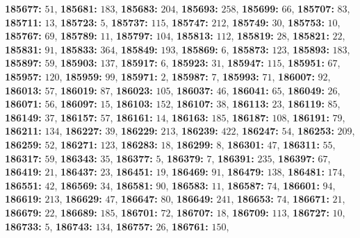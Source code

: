 \textsf{\bfseries 185677:} $51$, \textsf{\bfseries 185681:} $183$, \textsf{\bfseries 185683:} $204$, \textsf{\bfseries 185693:} $258$, \textsf{\bfseries 185699:} $66$, \textsf{\bfseries 185707:} $83$, \textsf{\bfseries 185711:} $13$, \textsf{\bfseries 185723:} $5$, \textsf{\bfseries 185737:} $115$, \textsf{\bfseries 185747:} $212$, \textsf{\bfseries 185749:} $30$, \textsf{\bfseries 185753:} $10$, \textsf{\bfseries 185767:} $69$, \textsf{\bfseries 185789:} $11$, \textsf{\bfseries 185797:} $104$, \textsf{\bfseries 185813:} $112$, \textsf{\bfseries 185819:} $28$, \textsf{\bfseries 185821:} $22$, \textsf{\bfseries 185831:} $91$, \textsf{\bfseries 185833:} $364$, \textsf{\bfseries 185849:} $193$, \textsf{\bfseries 185869:} $6$, \textsf{\bfseries 185873:} $123$, \textsf{\bfseries 185893:} $183$, \textsf{\bfseries 185897:} $59$, \textsf{\bfseries 185903:} $137$, \textsf{\bfseries 185917:} $6$, \textsf{\bfseries 185923:} $31$, \textsf{\bfseries 185947:} $115$, \textsf{\bfseries 185951:} $67$, \textsf{\bfseries 185957:} $120$, \textsf{\bfseries 185959:} $99$, \textsf{\bfseries 185971:} $2$, \textsf{\bfseries 185987:} $7$, \textsf{\bfseries 185993:} $71$, \textsf{\bfseries 186007:} $92$, \textsf{\bfseries 186013:} $57$, \textsf{\bfseries 186019:} $87$, \textsf{\bfseries 186023:} $105$, \textsf{\bfseries 186037:} $46$, \textsf{\bfseries 186041:} $65$, \textsf{\bfseries 186049:} $26$, \textsf{\bfseries 186071:} $56$, \textsf{\bfseries 186097:} $15$, \textsf{\bfseries 186103:} $152$, \textsf{\bfseries 186107:} $38$, \textsf{\bfseries 186113:} $23$, \textsf{\bfseries 186119:} $85$, \textsf{\bfseries 186149:} $37$, \textsf{\bfseries 186157:} $57$, \textsf{\bfseries 186161:} $14$, \textsf{\bfseries 186163:} $185$, \textsf{\bfseries 186187:} $108$, \textsf{\bfseries 186191:} $79$, \textsf{\bfseries 186211:} $134$, \textsf{\bfseries 186227:} $39$, \textsf{\bfseries 186229:} $213$, \textsf{\bfseries 186239:} $422$, \textsf{\bfseries 186247:} $54$, \textsf{\bfseries 186253:} $209$, \textsf{\bfseries 186259:} $52$, \textsf{\bfseries 186271:} $123$, \textsf{\bfseries 186283:} $18$, \textsf{\bfseries 186299:} $8$, \textsf{\bfseries 186301:} $47$, \textsf{\bfseries 186311:} $55$, \textsf{\bfseries 186317:} $59$, \textsf{\bfseries 186343:} $35$, \textsf{\bfseries 186377:} $5$, \textsf{\bfseries 186379:} $7$, \textsf{\bfseries 186391:} $235$, \textsf{\bfseries 186397:} $67$, \textsf{\bfseries 186419:} $21$, \textsf{\bfseries 186437:} $23$, \textsf{\bfseries 186451:} $19$, \textsf{\bfseries 186469:} $91$, \textsf{\bfseries 186479:} $138$, \textsf{\bfseries 186481:} $174$, \textsf{\bfseries 186551:} $42$, \textsf{\bfseries 186569:} $34$, \textsf{\bfseries 186581:} $90$, \textsf{\bfseries 186583:} $11$, \textsf{\bfseries 186587:} $74$, \textsf{\bfseries 186601:} $94$, \textsf{\bfseries 186619:} $213$, \textsf{\bfseries 186629:} $47$, \textsf{\bfseries 186647:} $80$, \textsf{\bfseries 186649:} $241$, \textsf{\bfseries 186653:} $74$, \textsf{\bfseries 186671:} $21$, \textsf{\bfseries 186679:} $22$, \textsf{\bfseries 186689:} $185$, \textsf{\bfseries 186701:} $72$, \textsf{\bfseries 186707:} $18$, \textsf{\bfseries 186709:} $113$, \textsf{\bfseries 186727:} $10$, \textsf{\bfseries 186733:} $5$, \textsf{\bfseries 186743:} $134$, \textsf{\bfseries 186757:} $26$, \textsf{\bfseries 186761:} $150$, 
